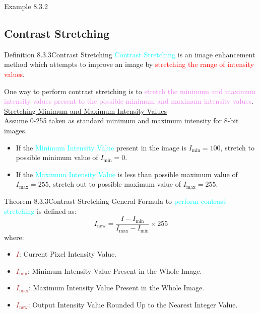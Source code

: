 \documentclass{book}
\begin{document}
\begin{egBox}{Example 8.3.2}{}
\begin{center}
    \end{center}
\end{egBox}
\subsection{Contrast Stretching}
\begin{defBox}{Definition 8.3.3}{Contrast Stretching}
    \textcolor{cyan}{Contrast Stretching} is an image enhancement method which attempts to improve an image by \textcolor{red}{stretching the range of intensity values}.
\end{defBox}
One way to perform contrast stretching is to \textcolor{violet}{stretch the minimum and maximum intensity values present to the possible minimum and maximum intensity values}.\\
\vspace{2mm}
\uline{Stretching Minimum and Maximum Intensity Values}\\
\vspace{1mm}
Assume 0-255 taken as standard minimum and maximum intensity for 8-bit images.\\
\begin{itemize}
    \item If the \textcolor{cyan}{Minimum Intensity Value} present in the image is \(I_{\text{min}} = 100\), stretch to possible minimum value of \(I_{\text{min}} = 0\).\\
    \item If the \textcolor{cyan}{Maximum Intensity Value} is less than possible maximum value of \(I_{\text{max}} = 255\), stretch out to possible maximum value of \(I_{\text{max}} = 255\).
\end{itemize}
\begin{thmBox}{Theorem 8.3.3}{Contrast Stretching}
    General Formula to \textcolor{cyan}{perform contrast stretching} is defined as:
    \[
        I_{\text{new}} = \frac{I - I_{\text{min}}}{I_{\text{max}} - I_{\text{min}}} \times 255
    \]
    where:
    \begin{itemize}
        \item \textcolor{brown}{\(I\)}: Current Pixel Intensity Value.
        \item \textcolor{brown}{\(I_{\text{min}}\)}: Minimum Intensity Value Present in the Whole Image.
        \item \textcolor{brown}{\(I_{\text{max}}\)}: Maximum Intensity Value Present in the Whole Image.
        \item \textcolor{brown}{\(I_{\text{new}}\)}: Output Intensity Value Rounded Up to the Nearest Integer Value.
    \end{itemize}
\end{thmBox}
\end{document}
